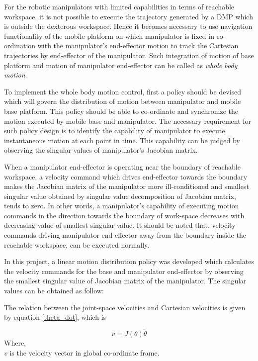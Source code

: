 For the robotic manipulators with limited capabilities in terms of reachable workspace, it is not possible to execute the trajectory generated by a DMP which is outside the dexterous workspace. Hence it becomes necessary to use navigation functionality of the mobile platform on which manipulator is fixed in co-ordination with the manipulator's end-effector motion to track the Cartesian trajectories by end-effector of the manipulator. Such integration of motion of base platform and motion of manipulator end-effector can be called as \textit{whole body motion}.  

To implement the whole body motion control, first a policy should be devised which will govern the distribution of motion between manipulator and mobile base platform. This policy should be able to co-ordinate and synchronize the motion executed by mobile base and manipulator. The necessary requirement for such policy design is to identify the capability of manipulator to execute instantaneous motion at each point in time. This capability can be judged by observing the singular values of manipulator's Jacobian matrix.

When a manipulator end-effector is operating near the boundary of reachable workspace, a velocity command which drives end-effector towards the boundary makes the Jacobian matrix of the manipulator more ill-conditioned and smallest singular value obtained by singular value decomposition of Jacobian matrix, tends to zero\cite{wampler1986manipulator}. In other words, a manipulator's capability of executing motion commands in the direction towards the boundary of work-space decreases with decreasing value of smallest singular value. It should be noted that, velocity commands driving manipulator end-effector away from the boundary inside the reachable workspace, can be executed normally.    

In this project, a linear motion distribution policy was developed which calculates the velocity commands for the base and manipulator end-effector by observing the smallest singular value of Jacobian matrix of the manipulator. The singular values can be obtained as follow:

The relation between the joint-space velocities and Cartesian velocities is given by equation \ref{theta_dot}, which is 

\begin{equation}
	v = J(\theta) \dot{\theta} 
\end{equation}
Where, \\
$v$ is the velocity vector in global co-ordinate frame. 

